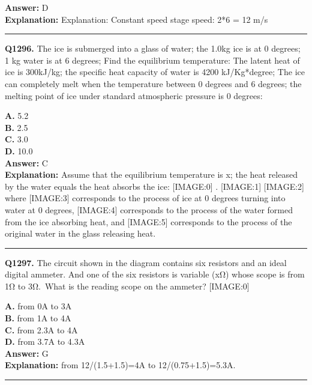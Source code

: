 \documentclass[12pt]{article}
\begin{document}
\textbf{Answer:} D \\
\textbf{Explanation:} Explanation:
Constant speed stage speed: 2*6 = 12 m/s

\hrule
\vspace{1em}


\noindent
\textbf{Q1296.} The ice is submerged into a glass of water; the 1.0kg ice is at 0 degrees; 1 kg water is at 6 degrees; Find the equilibrium temperature: The latent heat of ice is 300kJ/kg; the specific heat capacity of water is 4200 kJ/Kg*degree; The ice can completely melt when the temperature between 0 degrees and 6 degrees; the melting point of ice under standard atmospheric pressure is 0 degrees:



\textbf{A.} 5.2 \\
\textbf{B.} 2.5 \\
\textbf{C.} 3.0 \\
\textbf{D.} 10.0 \\

\textbf{Answer:} C \\
\textbf{Explanation:} Assume that the equilibrium temperature is x; the heat released by the water equals the heat absorbs the ice:
[IMAGE:0]
.
[IMAGE:1]
[IMAGE:2]
where
[IMAGE:3]
corresponds to the process of ice at 0 degrees turning into water at 0 degrees,
[IMAGE:4]
corresponds to the process of the water formed from the ice absorbing heat, and
[IMAGE:5]
corresponds to the process of the original water in the glass releasing heat.

\hrule
\vspace{1em}


\noindent
\textbf{Q1297.} The circuit shown in the diagram contains six resistors and an ideal digital ammeter. And one of the six resistors is variable (xΩ) whose scope is from 1Ω to 3Ω. What is the reading scope on the ammeter?
[IMAGE:0]



\textbf{A.} from 0A to 3A \\
\textbf{B.} from 1A to 4A \\
\textbf{C.} from 2.3A to 4A \\
\textbf{D.} from 3.7A to 4.3A \\

\textbf{Answer:} G \\
\textbf{Explanation:} from 12/(1.5+1.5)=4A to 12/(0.75+1.5)=5.3A.

\hrule
\vspace{1em}
\end{document}
